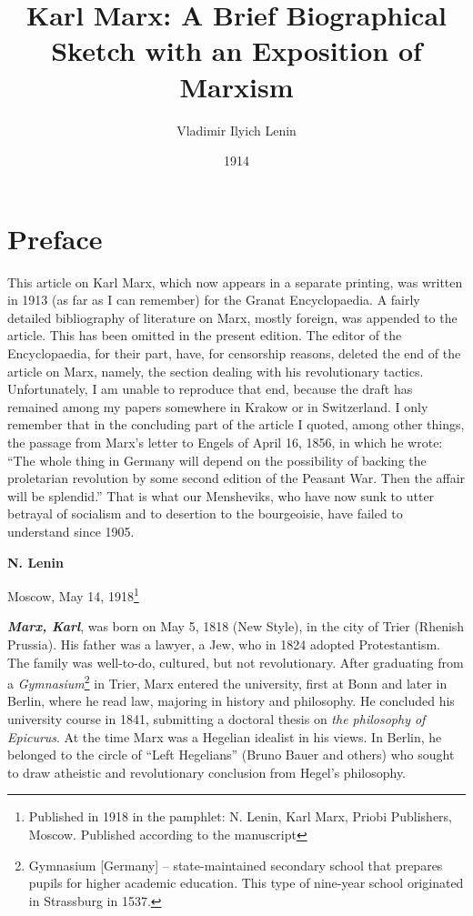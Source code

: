 \documentclass[a4paper,12pt]{book}
\title{Karl Marx: A Brief Biographical Sketch with an Exposition of Marxism}
\author{Vladimir Ilyich Lenin}
\date{1914}
\newcommand{\q}[1]{``#1''}
\begin{document}
\frontmatter
\maketitle
\chapter*{Preface}

This article on Karl Marx, which now appears in a separate printing, was written in 1913 (as far as I can remember) for the Granat Encyclopaedia. A fairly detailed bibliography of literature on Marx, mostly foreign, was appended to the article. This has been omitted in the present edition. The editor of the Encyclopaedia, for their part, have, for censorship reasons, deleted the end of the article on Marx, namely, the section dealing with his revolutionary tactics. Unfortunately, I am unable to reproduce that end, because the draft has remained among my papers somewhere in Krakow or in Switzerland. I only remember that in the concluding part of the article I quoted, among other things, the passage from Marx’s letter to Engels of April 16, 1856, in which he wrote: \q{The whole thing in Germany will depend on the possibility of backing the proletarian revolution by some second edition of the Peasant War. Then the affair will be splendid.} That is what our Mensheviks, who have now sunk to utter betrayal of socialism and to desertion to the bourgeoisie, have failed to understand since 1905.

\begin{flushright}
  \textbf{N. Lenin}
  
Moscow, May 14, 1918\footnote{Published in 1918 in the pamphlet: N. Lenin, Karl Marx, Priobi Publishers, Moscow. Published according to the manuscript}
\end{flushright}




\mainmatter

\textbf{\emph{Marx, Karl}}, was born on May 5, 1818 (New Style), in the city of Trier (Rhenish Prussia). His father was a lawyer, a Jew, who in 1824 adopted Protestantism. The family was well-to-do, cultured, but not revolutionary. After graduating from a \emph{Gymnasium}\footnote{Gymnasium [Germany] -- state-maintained secondary school that prepares pupils for higher academic education. This type of nine-year school originated in Strassburg in 1537. } in Trier, Marx entered the university, first at Bonn and later in Berlin, where he read law, majoring in history and philosophy. He concluded his university course in 1841, submitting a doctoral thesis on \emph{the philosophy of Epicurus}. At the time Marx was a Hegelian idealist in his views. In Berlin, he belonged to the circle of \q{Left Hegelians} (Bruno Bauer and others) who sought to draw atheistic and revolutionary conclusion from Hegel’s philosophy.
\end{document}
